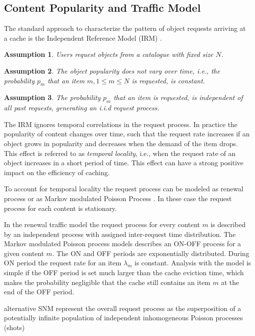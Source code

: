 \subsection{Content Popularity and Traffic Model}
The standard approach to characterize the pattern of object requests arriving at a cache is the Independent Reference Model (IRM) \cite{coffman1973operating}.
\newtheorem{irma}{Assumption}\begin{irma}\label{catalouge}
Users request objects from a catalogue with fixed size $N$.
\end{irma}
\newtheorem{irmb}[irma]{Assumption}\begin{irmb}\label{pmc}
The object popularity does not vary over time, i.e., the probability $p_m$ that an item $m, 1\leq m \leq N$ is requested, is constant.
\end{irmb}
\newtheorem{irmc}[irma]{Assumption}\begin{irmc}\label{iid}
The probability $p_m$ that an item is requested, is independent of all past requests, generating an i.i.d request process.
\end{irmc}

The IRM ignores temporal correlations in the request process.
In practice the popularity of content changes over time, such that the request rate increases if an object grows in popularity and decreases when the demand of the item drops. This effect is referred to as \textit{temporal locality}, i.e., when the request rate of an object increases in a short period of time.
This effect can have a strong positive impact on the efficiency of caching.

To account for temporal locality the request process can be modeled as renewal process \cite{martina2014unified} or as Markov modulated Poisson Process \cite{garetto2014dynamic}.
In these case the request process for each content is stationary.

In the renewal traffic model the request process for every content $m$ is described by an independent process with assigned inter-request time distribution.
The Markov modulated Poisson process models describes an ON-OFF process for a given content $m$.
The ON and OFF periods are exponentially distributed.
During ON period the request rate for an item $\lambda_m$ is constant.
Analysis with the model is simple if the OFF period is set much larger than the cache eviction time, which makes the probability negligible that the cache still contains an item $m$ at the end of the OFF period.


alternative SNM \cite{traverso2013temporal}
represent the overall request process as the superposition of a potentially infinite population of independent inhomogeneous Poisson processes (shots)

